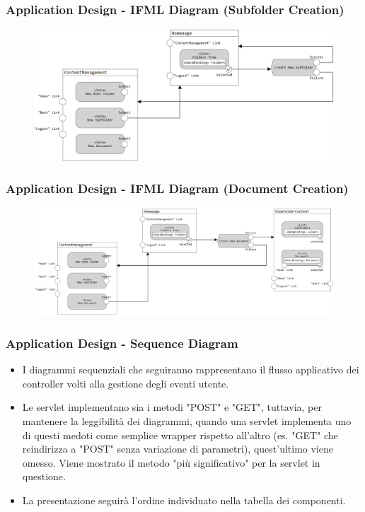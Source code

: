 \documentclass[aspectratio=169, dvipsnames]{beamer}
\begin{document}
\begin{frame}
    \frametitle{Application Design - IFML Diagram (Subfolder Creation)}
    \begin{figure}
        \centering
        \includegraphics[width=0.9\linewidth]{Resources/IFMLs/images/IFML - Subfolder Creation.png}
    \end{figure}
\end{frame}

\begin{frame}
    \frametitle{Application Design - IFML Diagram (Document Creation)}
    \begin{figure}
        \centering
        \includegraphics[width=0.9\linewidth]{Resources/IFMLs/images/IFML - Document Creation.png}
    \end{figure}
\end{frame}

\begin{frame}
    \frametitle{Application Design - Sequence Diagram}
    \begin{itemize}
        \item I diagrammi sequenziali che seguiranno rappresentano il flusso applicativo dei controller volti alla
              gestione degli eventi utente.
        \item Le servlet implementano sia i metodi "POST" e "GET", tuttavia, per mantenere la leggibilità dei diagrammi,
              quando una servlet implementa uno di questi medoti come semplice wrapper rispetto all'altro (es. "GET" che
              reindirizza a "POST" senza variazione di parametri), quest'ultimo viene omesso. Viene mostrato il metodo
              "più significativo" per la servlet in questione.
        \item La presentazione seguirà l'ordine individuato nella tabella dei componenti.
    \end{itemize}
\end{frame}
\end{document}
